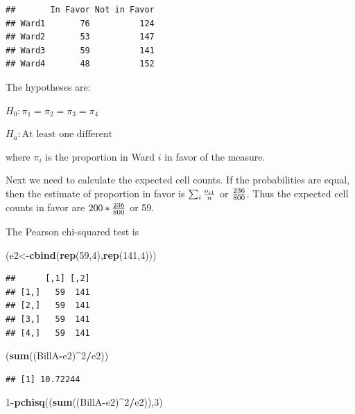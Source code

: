 \documentclass[]{book}
\newenvironment{Shaded}{\begin{snugshade}}{\end{snugshade}}
\newcommand{\KeywordTok}[1]{\textcolor[rgb]{0.13,0.29,0.53}{\textbf{#1}}}
\newcommand{\DecValTok}[1]{\textcolor[rgb]{0.00,0.00,0.81}{#1}}
\newcommand{\OperatorTok}[1]{\textcolor[rgb]{0.81,0.36,0.00}{\textbf{#1}}}
\newcommand{\NormalTok}[1]{#1}
\theoremstyle{definition}
\theoremstyle{definition}
\theoremstyle{definition}
\theoremstyle{remark}
\begin{document}
\begin{verbatim}
##       In Favor Not in Favor
## Ward1       76          124
## Ward2       53          147
## Ward3       59          141
## Ward4       48          152
\end{verbatim}

The hypotheses are:

\(H_{0}: \pi_{1}=\pi_{2}=\pi_{3}=\pi_{4}\)

\(H_{a}: \mbox{At least one different}\)

where \(\pi_{i}\) is the proportion in Ward \(i\) in favor of the
measure.

Next we need to calculate the expected cell counts. If the probabilities
are equal, then the estimate of proportion in favor is
\(\sum_{i}{o_{i1} \over n}\) or \({236 \over 800}\). Thus the expected
cell counts in favor are \(200*{236 \over 800}\) or 59.

The Pearson chi-squared test is

\begin{Shaded}
\begin{Highlighting}[]
\NormalTok{(e2<-}\KeywordTok{cbind}\NormalTok{(}\KeywordTok{rep}\NormalTok{(}\DecValTok{59}\NormalTok{,}\DecValTok{4}\NormalTok{),}\KeywordTok{rep}\NormalTok{(}\DecValTok{141}\NormalTok{,}\DecValTok{4}\NormalTok{)))}
\end{Highlighting}
\end{Shaded}

\begin{verbatim}
##      [,1] [,2]
## [1,]   59  141
## [2,]   59  141
## [3,]   59  141
## [4,]   59  141
\end{verbatim}

\begin{Shaded}
\begin{Highlighting}[]
\NormalTok{(}\KeywordTok{sum}\NormalTok{((BillA}\OperatorTok{-}\NormalTok{e2)}\OperatorTok{^}\DecValTok{2}\OperatorTok{/}\NormalTok{e2))}
\end{Highlighting}
\end{Shaded}

\begin{verbatim}
## [1] 10.72244
\end{verbatim}

\begin{Shaded}
\begin{Highlighting}[]
\DecValTok{1}\OperatorTok{-}\KeywordTok{pchisq}\NormalTok{((}\KeywordTok{sum}\NormalTok{((BillA}\OperatorTok{-}\NormalTok{e2)}\OperatorTok{^}\DecValTok{2}\OperatorTok{/}\NormalTok{e2)),}\DecValTok{3}\NormalTok{)}
\end{Highlighting}
\end{Shaded}
\end{document}
